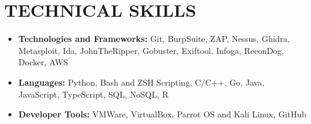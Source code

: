 \documentclass[letterpaper,11pt]{article}
\newcommand{\resumeItem}[1]{
  \item\small{
    {#1 \vspace{-2pt}}
  }
}
\newcommand{\resumeItemListStart}{\begin{itemize}}
\newcommand{\resumeItemListEnd}{\end{itemize}\vspace{-5pt}}
\begin{document}
\section{TECHNICAL SKILLS}
    \vspace{2.5pt}
    \begin{itemize}[leftmargin=0in, label={}]
        \small{\item{
        \resumeItemListStart
            \resumeItem{\textbf{\normalsize{Technologies and Frameworks:}}{ \normalsize{Git, BurpSuite, ZAP, Nessus, Ghidra, Metasploit, Ida, JohnTheRipper, Gobuster, Exiftool, Infoga, ReconDog, Docker, AWS}}} \vspace{2.5pt} \\
            
            \resumeItem{\textbf{\normalsize{Languages:}}{ \normalsize{Python, Bash and ZSH Scripting, C/C++, Go, Java, JavaScript, TypeScript, SQL, NoSQL, R}}} \vspace{2.5pt} \\
            
            \resumeItem{\textbf{\normalsize{Developer Tools:}}{ \normalsize{VMWare, VirtualBox, Parrot OS and Kali Linux, GitHub}}} \vspace{2.5pt} \\
            
        \resumeItemListEnd
        }}
    \end{itemize}



\end{document}
